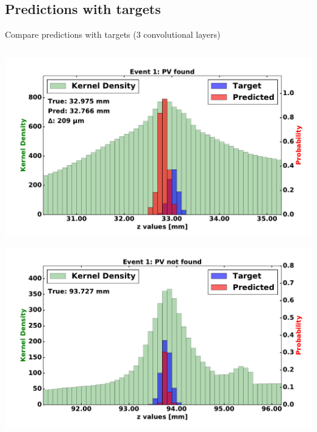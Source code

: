 %

\subsection{Predictions with targets}
\begin{frame}{Compare predictions with targets (3 convolutional layers)}
  \begin{columns}[c]
        \begin{center}
            \includegraphics[width=1\textwidth,height=0.45\textwidth, trim=18 0 18 0]{images/120000_3layer_04.pdf}

            \includegraphics[width=1\textwidth, height=0.45\textwidth,trim=18 0 18 0]{images/120000_3layer_05.pdf}


\end{center}
\end{columns}
\end{frame}

